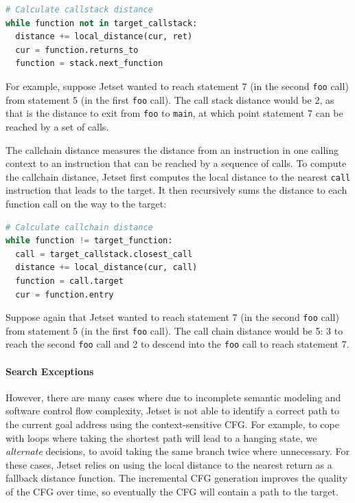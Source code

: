 \begin{lstlisting}[language=python]
# Calculate callstack distance
while function not in target_callstack:
  distance += local_distance(cur, ret)
  cur = function.returns_to
  function = stack.next_function  
\end{lstlisting}

For example, suppose Jetset wanted to reach statement 7 (in the second \texttt{foo} call) from statement 5 (in the first \texttt{foo} call).
The call stack distance would be 2, as that is the distance to exit from \texttt{foo} to \texttt{main}, at which point statement 7 can be reached by a set of calls.

The callchain distance measures the distance from an instruction in one calling context to an instruction that can be reached by a sequence of calls.
To compute the callchain distance, Jetset first computes the local distance to the nearest \texttt{call} instruction that leads to the target.
It then recursively sums the distance to each function call on the way to the target:

\newpage

\begin{lstlisting}[language=python]
# Calculate callchain distance
while function != target_function:
  call = target_callstack.closest_call
  distance += local_distance(cur, call)
  function = call.target
  cur = function.entry     
\end{lstlisting}

Suppose again  that Jetset wanted to reach statement 7 (in the second \texttt{foo} call) from statement 5 (in the first \texttt{foo} call).
The call chain distance would be 5: 3 to reach the second \texttt{foo} call and 2 to descend into the \texttt{foo} call to reach statement 7.

\paragraph{Search Exceptions}
However, there are many cases where due to incomplete semantic modeling and software control flow complexity, Jetset is not able to identify a correct path to the current goal address using the context-sensitive CFG.
For example, to cope with loops where taking the shortest path will lead to a hanging state, we \emph{alternate} decisions, to avoid taking the same branch twice where unnecessary.
For these cases, Jetset relies on using the local distance to the nearest return as a fallback distance function.
The incremental CFG generation improves the quality of the CFG over time, so eventually the CFG will contain a path to the target.


